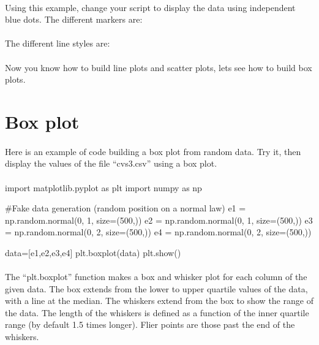 \documentclass[article,10pt]{scrartcl}
\begin{document}
\paragraph{}
Using this example, change your script to display the data using independent blue dots. The different markers are: 
\begin{python}
\end{python}
\paragraph{}
The different line styles are:
\begin{python}
[ '-' | '--' | '-.' | ':' | 'None' | ' ' | '' ] 
\end{python}
\paragraph{}
Now you know how to build line plots and scatter plots, lets see how to build box plots.

\section{Box plot}
\paragraph{}
Here is an example of code building a box plot from random data. Try it, then display the values of the file ``cvs3.csv'' using a box plot. 
\paragraph{}
\begin{python}
import matplotlib.pyplot as plt
import numpy as np

#Fake data generation (random position on a normal law)
e1 = np.random.normal(0, 1, size=(500,))
e2 = np.random.normal(0, 1, size=(500,))
e3 = np.random.normal(0, 2, size=(500,))
e4 = np.random.normal(0, 2, size=(500,))

data=[e1,e2,e3,e4]
plt.boxplot(data)
plt.show()
\end{python}
\paragraph{}
The ``plt.boxplot'' function makes a box and whisker plot for each column of the given data.  The box extends from the lower to upper quartile values of the data, with a line at the median.
The whiskers extend from the box to show the range of the data.  The length of the whiskers is defined as a function of the inner quartile range (by default 1.5 times longer). Flier points are those past the end of the whiskers. 
\end{document}
